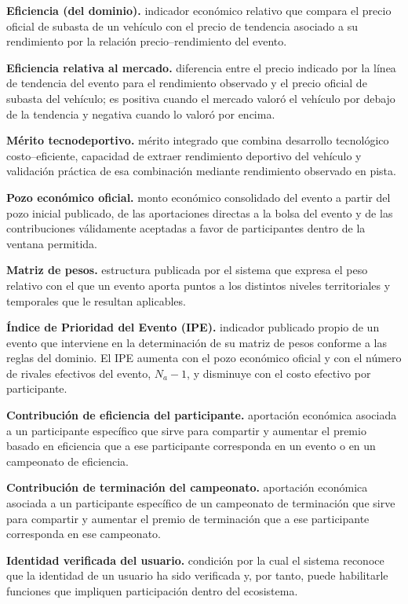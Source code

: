 \documentclass[10pt,letterpaper]{article}
\begin{document}
\noindent\textbf{Eficiencia (del dominio).} indicador económico relativo que compara el precio oficial de subasta de un vehículo con el precio de tendencia asociado a su rendimiento por la relación precio--rendimiento del evento.\par
\noindent\textbf{Eficiencia relativa al mercado.} diferencia entre el precio indicado por la línea de tendencia del evento para el rendimiento observado y el precio oficial de subasta del vehículo; es positiva cuando el mercado valoró el vehículo por debajo de la tendencia y negativa cuando lo valoró por encima.\par
\noindent\textbf{Mérito tecnodeportivo.} mérito integrado que combina desarrollo tecnológico costo--eficiente, capacidad de extraer rendimiento deportivo del vehículo y validación práctica de esa combinación mediante rendimiento observado en pista.\par
\noindent\textbf{Pozo económico oficial.} monto económico consolidado del evento a partir del pozo inicial publicado, de las aportaciones directas a la bolsa del evento y de las contribuciones válidamente aceptadas a favor de participantes dentro de la ventana permitida.\par
\noindent\textbf{Matriz de pesos.} estructura publicada por el sistema que expresa el peso relativo con el que un evento aporta puntos a los distintos niveles territoriales y temporales que le resultan aplicables.\par
\noindent\textbf{Índice de Prioridad del Evento (IPE).} indicador publicado propio de un evento que interviene en la determinación de su matriz de pesos conforme a las reglas del dominio. El IPE aumenta con el pozo económico oficial y con el número de rivales efectivos del evento, $N_a-1$, y disminuye con el costo efectivo por participante.\par
\noindent\textbf{Contribución de eficiencia del participante.} aportación económica asociada a un participante específico que sirve para compartir y aumentar el premio basado en eficiencia que a ese participante corresponda en un evento o en un campeonato de eficiencia.\par
\noindent\textbf{Contribución de terminación del campeonato.} aportación económica asociada a un participante específico de un campeonato de terminación que sirve para compartir y aumentar el premio de terminación que a ese participante corresponda en ese campeonato.\par
\noindent\textbf{Identidad verificada del usuario.} condición por la cual el sistema reconoce que la identidad de un usuario ha sido verificada y, por tanto, puede habilitarle funciones que impliquen participación dentro del ecosistema.\par
\end{document}
